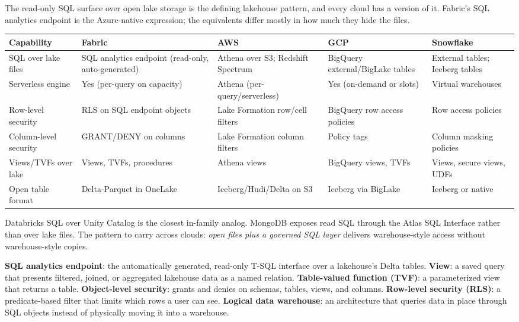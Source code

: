 \begin{crosscloud}
The read-only SQL surface over open lake storage is the defining lakehouse pattern, and every cloud has a version of it. Fabric's SQL analytics endpoint is the Azure-native expression; the equivalents differ mostly in how much they hide the files.

\vspace{2mm}
{\footnotesize
\begin{tabular}{@{}p{2.8cm}p{3.2cm}p{3.2cm}p{3.2cm}p{3.2cm}@{}}
\toprule
\textbf{Capability} & \textbf{Fabric} & \textbf{AWS} & \textbf{GCP} & \textbf{Snowflake} \\
\midrule
SQL over lake files & SQL analytics endpoint (read-only, auto-generated) & Athena over S3; Redshift Spectrum & BigQuery external/BigLake tables & External tables; Iceberg tables \\
Serverless engine & Yes (per-query on capacity) & Athena (per-query/serverless) & Yes (on-demand or slots) & Virtual warehouses \\
Row-level security & RLS on SQL endpoint objects & Lake Formation row/cell filters & BigQuery row access policies & Row access policies \\
Column-level security & GRANT/DENY on columns & Lake Formation column filters & Policy tags & Column masking policies \\
Views/TVFs over lake & Views, TVFs, procedures & Athena views & BigQuery views, TVFs & Views, secure views, UDFs \\
Open table format & Delta-Parquet in OneLake & Iceberg/Hudi/Delta on S3 & Iceberg via BigLake & Iceberg or native \\
\bottomrule
\end{tabular}}

\vspace{1mm}
Databricks SQL over Unity Catalog is the closest in-family analog. MongoDB exposes read SQL through the Atlas SQL Interface rather than over lake files. The pattern to carry across clouds: \emph{open files plus a governed SQL layer} delivers warehouse-style access without warehouse-style copies.
\end{crosscloud}

\begin{keyterms}
\textbf{SQL analytics endpoint}: the automatically generated, read-only T-SQL interface over a lakehouse's Delta tables. \quad
\textbf{View}: a saved query that presents filtered, joined, or aggregated lakehouse data as a named relation. \quad
\textbf{Table-valued function (TVF)}: a parameterized view that returns a table. \quad
\textbf{Object-level security}: grants and denies on schemas, tables, views, and columns. \quad
\textbf{Row-level security (RLS)}: a predicate-based filter that limits which rows a user can see. \quad
\textbf{Logical data warehouse}: an architecture that queries data in place through SQL objects instead of physically moving it into a warehouse.
\end{keyterms}

